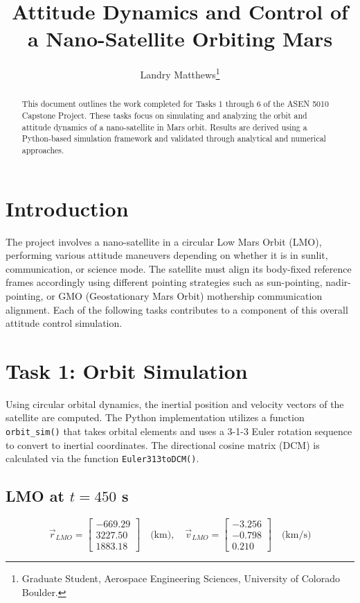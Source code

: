 \documentclass[conf]{article}
\title{Attitude Dynamics and Control of a Nano-Satellite Orbiting Mars}
\author{Landry Matthews\footnote{Graduate Student, Aerospace Engineering Sciences, University of Colorado Boulder.}}
\affil{University of Colorado Boulder, Boulder, CO, 80309}
\begin{document}
\maketitle

\begin{abstract}
This document outlines the work completed for Tasks 1 through 6 of the ASEN 5010 Capstone Project. These tasks focus on simulating and analyzing the orbit and attitude dynamics of a nano-satellite in Mars orbit. Results are derived using a Python-based simulation framework and validated through analytical and numerical approaches.
\end{abstract}

\section*{Introduction}
The project involves a nano-satellite in a circular Low Mars Orbit (LMO), performing various attitude maneuvers depending on whether it is in sunlit, communication, or science mode. The satellite must align its body-fixed reference frames accordingly using different pointing strategies such as sun-pointing, nadir-pointing, or GMO (Geostationary Mars Orbit) mothership communication alignment. Each of the following tasks contributes to a component of this overall attitude control simulation.
\newpage
\section{Task 1: Orbit Simulation}
Using circular orbital dynamics, the inertial position and velocity vectors of the satellite are computed. The Python implementation utilizes a function \texttt{orbit\_sim()} that takes orbital elements and uses a 3-1-3 Euler rotation sequence to convert to inertial coordinates. The directional cosine matrix (DCM) is calculated via the function \texttt{Euler313toDCM()}.

\subsection*{LMO at $t = 450$ s}
\[
\vec{r}_{LMO} = 
\begin{bmatrix}
-669.29 \\ 3227.50 \\ 1883.18
\end{bmatrix} \quad \text{(km)}, \quad
\vec{v}_{LMO} = 
\begin{bmatrix}
-3.256 \\ -0.798 \\ 0.210
\end{bmatrix} \quad \text{(km/s)}
\]
\end{document}

